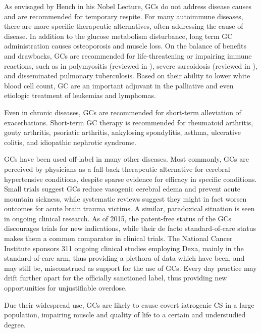 \documentclass[12pt,english]{report}\usepackage[]{graphicx}\usepackage[]{color}
\begin{document}
As envisaged by Hench in his Nobel Lecture, GCs do not address disease
causes and are recommended for temporary respite. For many autoimmune
diseases, there are more specific therapeutic alternatives, often
addressing the cause of disease. In addition to the glucose metabolism
disturbance, long term GC administration causes osteoporosis and muscle
loss. On the balance of benefits and drawbacks, GCs are recommended
for life-threatening or impairing immune reactions, such as in polymyositis
(reviewed in \citep{marie2011therapy}), severe sarcoidosis (reviewed
in \citep{dempsey2009sarcoidosis}), and disseminated pulmonary tuberculosis.
Based on their ability to lower white blood cell count, GC are an
important adjuvant in the palliative and even etiologic treatment
of leukemias and lymphomas\citep{crump2014randomized,pui2006treatment,stewart2015carfilzomib}.

Even in chronic diseases, GCs are recommended for short-term alleviation
of exacerbations. Short-term GC therapy is recommended for rheumatoid
arthritis, gouty arthritis, psoriatic arthritis, ankylosing spondylitis,
asthma\citep{keeney2014dexamethasone,qureshi2001comparative}, ulcerative
colitis\citep{crotty1992drug,rosenberg1990high-dose}, and idiopathic
nephrotic syndrome\citep{haack1999glucocorticoid}.

GCs have been used off-label in many other diseases. Most commonly,
GCs are perceived by physicians as a fall-back therapeutic alternative
for cerebral hypertensive conditions, despite sparse evidence for
efficacy in specific conditions. Small trials suggest GCs reduce vasogenic
cerebral edema\citep{kotsarini2010systematic} and prevent acute mountain
sickness\citep{levine1989dexamethasone}, while systematic reviews
suggest they might in fact worsen outcomes for acute brain trauma
victims\citep{alderson2005corticosteroids}. A similar, paradoxical
situation is seen in ongoing clinical research. As of 2015, the patent-free
status of the GCs discourages trials for new indications, while their
de facto standard-of-care status makes them a common comparator in
clinical trials. The National Cancer Institute sponsors 311 ongoing
clinical studies employing Dexa, mainly in the standard-of-care arm,
thus providing a plethora of data which have been, and may still be,
misconstrued as support for the use of GCs. Every day practice may
drift further apart for the officially sanctioned label, thus providing
new opportunities for unjustifiable overdose.

Due their widespread use, GCs are likely to cause covert iatrogenic
CS in a large population, impairing muscle and quality of life to
a certain and understudied degree.
\end{document}
